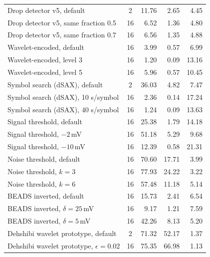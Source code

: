 \begin{longtable}{@{}>{\raggedright\arraybackslash}p{7.0cm} c r r r@{}}
\addlinespace
Drop detector v5, default & 2 & 11.76 & 2.65 & 4.45\\
Drop detector v5, same fraction 0.5 & 16 & 6.52 & 1.36 & 4.80\\
Drop detector v5, same fraction 0.7 & 16 & 6.56 & 1.35 & 4.88\\
\addlinespace
Wavelet-encoded, default & 16 & 3.99 & 0.57 & 6.99\\
Wavelet-encoded, level 3 & 16 & 1.20 & 0.09 & 13.16\\
Wavelet-encoded, level 5 & 16 & 5.96 & 0.57 & 10.45\\
\addlinespace
Symbol search (dSAX), default & 2 & 36.03 & 4.82 & 7.47\\
Symbol search (dSAX), 10 s/symbol & 16 & 2.36 & 0.14 & 17.24\\
Symbol search (dSAX), 40 s/symbol & 16 & 1.24 & 0.09 & 13.63\\
\addlinespace
Signal threshold, default & 16 & 25.38 & 1.79 & 14.18\\
Signal threshold, $-2$\,mV & 16 & 51.18 & 5.29 & 9.68\\
Signal threshold, $-10$\,mV & 16 & 12.39 & 0.58 & 21.31\\
\addlinespace
Noise threshold, default & 16 & 70.60 & 17.71 & 3.99\\
Noise threshold, $k=3$ & 16 & 77.93 & 24.22 & 3.22\\
Noise threshold, $k=6$ & 16 & 57.48 & 11.18 & 5.14\\
\addlinespace
BEADS inverted, default & 16 & 15.73 & 2.41 & 6.54\\
BEADS inverted, $\delta=25$\,mV & 16 & 9.17 & 1.21 & 7.59\\
BEADS inverted, $\delta=5$\,mV & 16 & 42.26 & 8.13 & 5.20\\
\addlinespace
Dehshibi wavelet prototype, default & 2 & 71.32 & 52.17 & 1.37\\
Dehshibi wavelet prototype, $\epsilon=0.02$ & 16 & 75.35 & 66.98 & 1.13\\

\end{longtable}
